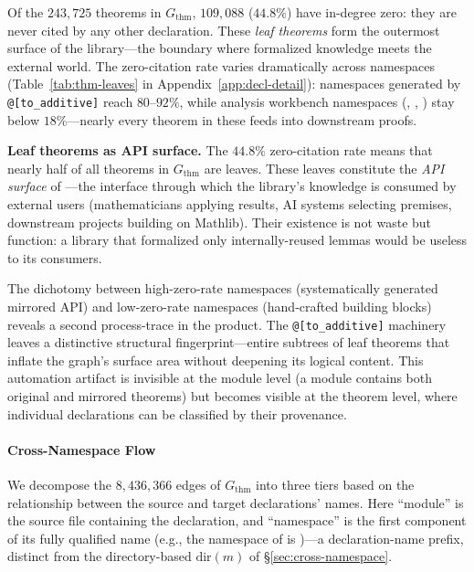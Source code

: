 Of the $243{,}725$ theorems in $G_{\mathrm{thm}}$, $109{,}088$ ($44.8\%$) have in-degree zero: they are never cited by any other declaration. These \emph{leaf theorems} form the outermost surface of the library---the boundary where formalized knowledge meets the external world. The zero-citation rate varies dramatically across namespaces (Table~\ref{tab:thm-leaves} in Appendix~\ref{app:decl-detail}): namespaces generated by \texttt{@[to\_additive]} reach $80$--$92\%$, while analysis workbench namespaces (, , ) stay below $18\%$---nearly every theorem in these feeds into downstream proofs.

\noindent\textbf{Leaf theorems as API surface.}
\label{rem:leaf-theorems}
The $44.8\%$ zero-citation rate means that nearly half of all theorems in $G_{\mathrm{thm}}$ are leaves. These leaves constitute the \emph{API surface} of ---the interface through which the library's knowledge is consumed by external users (mathematicians applying results, AI systems selecting premises, downstream projects building on Mathlib). Their existence is not waste but function: a library that formalized only internally-reused lemmas would be useless to its consumers.


The dichotomy between high-zero-rate namespaces (systematically generated mirrored API) and low-zero-rate namespaces (hand-crafted building blocks) reveals a second process-trace in the product. The \texttt{@[to\_additive]} machinery leaves a distinctive structural fingerprint---entire subtrees of leaf theorems that inflate the graph's surface area without deepening its logical content. This automation artifact is invisible at the module level (a module contains both original and mirrored theorems) but becomes visible at the theorem level, where individual declarations can be classified by their provenance.

\paragraph{Cross-Namespace Flow}
\label{sec:thm-cross-namespace}

We decompose the $8{,}436{,}366$ edges of $G_{\mathrm{thm}}$ into three tiers based on the relationship between the source and target declarations' names. Here ``module'' is the source file containing the declaration, and ``namespace'' is the first component of its fully qualified name (e.g., the namespace of  is )---a declaration-name prefix, distinct from the directory-based $\mathrm{dir}(m)$ of \S\ref{sec:cross-namespace}.

